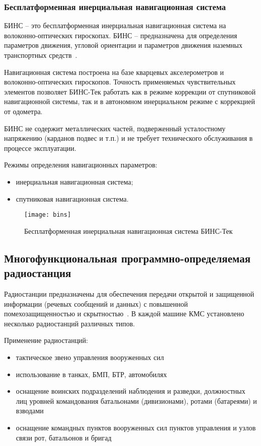 \subsubsection{Бесплатформенная инерциальная навигационная система}
\label{sub:lit_review:ins:bins}
БИНС -- это бесплатформенная инерциальная навигационная система на волоконно-оптических гироскопах.
БИНС -- предназначена для определения параметров движения, угловой ориентации и параметров движения наземных
транспортных средств~\cite{bins}.

Навигационная система построена на базе кварцевых акселерометров и волоконно-оптических гироскопов. Точность применяемых чувствительных элементов позволяет БИНС-Тек работать как в режиме коррекции от спутниковой навигационной системы, так и в автономном инерциальном режиме с коррекцией от одометра.

БИНС не содержит металлических частей, подверженный усталостному напряжению (карданов подвес и т.п.) и не требует технического обслуживания в процессе эксплуатации.

Режимы определения навигационных параметров:
\begin{itemize}
	\item инерциальная навигационная система;
	\item спутниковая навигационная система.
\end{itemize}
\begin{figure}[ht]
	\centering
	\texttt{[image: bins]}
	\caption{Бесплатформенная инерциальная навигационная система БИНС-Тек~\cite{bins}}
	\label{fig:lit_reiview:ins:bins}
\end{figure}

\subsection{Многофункциональная программно-определяемая радиостанция}
\label{sub:lit_review:radio}

Радиостанции предназначены для обеспечения передачи открытой и защищенной информации (речевых сообщений и данных) с
повышенной помехозащищенностью и скрытностью~\cite{prc9661}.
В каждой машине КМС установлено несколько радиостанций различных типов.

Применение радиостанций:
\begin{itemize}
	\item тактическое звено управления вооруженных сил
	\item использование в танках, БМП, БТР, автомобилях
	\item оснащение воинских подразделений наблюдения и разведки, должностных лиц уровней командования батальонами (дивизионами), ротами (батареями) и взводами
	\item оснащение командных пунктов вооруженных сил пунктов управления и узлов связи рот, батальонов и бригад
\end{itemize}

